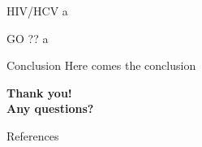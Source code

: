 \documentclass{beamer}\usepackage[]{graphicx}\usepackage[]{color}
\begin{document}
\begin{frame}[fragile]{HIV/HCV}
a
\end{frame}

\begin{frame}[fragile]{GO ??}
a
\end{frame}


\begin{frame}[fragile]{Conclusion}
Here comes the conclusion
\end{frame}



\begin{frame}[fragile]{}
\begin{center}
\Huge{\textbf{Thank you!}}\\
\Huge{\textbf{Any questions?}}
\end{center}
\end{frame}

\nocite{polonsky2019}
\nocite{richter2019}

\renewcommand*{\bibfont}{\scriptsize}
\begin{frame}[fragile]{References}
\printbibliography

\end{frame}
\end{document}
